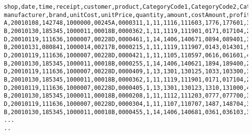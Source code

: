 \begin{verbatim}
shop,date,time,receipt,customer,product,CategoryCode1,CategoryCode2,CategoryCode4,CategoryCode6,
manufacturer,brand,unitCost,unitPrice,quantity,amount,costAmount,profit,YearMonth
A,20010108,142748,1000000,00245A,0000311,1,11,1116,111603,1776,177601,339,441,1,441,339,102,200101
B,20010130,185345,1000011,00018B,0000362,1,11,1119,111901,0171,017104,222,289,1,289,222,67,200101
D,20010119,111636,1000007,00228D,0000461,1,14,1406,140671,0894,089401,381,496,1,496,381,115,200101
B,20010131,080841,1000014,00217B,0000215,1,11,1119,111907,0143,014301,99,129,7,903,693,210,200101
D,20010119,111636,1000007,00228D,0000421,1,11,1105,110597,0616,061601,412,536,6,3216,2472,744,200101
B,20010130,185345,1000011,00018B,0000255,1,14,1406,140621,1894,189400,256,333,1,333,256,77,200101
D,20010119,111636,1000007,00228D,0000409,1,13,1301,130125,1033,103300,333,433,6,2598,1998,600,200101
B,20010130,185345,1000011,00018B,0000362,1,11,1119,111901,0171,017104,222,289,1,289,222,67,200101
D,20010119,111636,1000007,00228D,0000405,1,13,1301,130123,1310,131000,408,531,1,531,408,123,200101
B,20010130,185345,1000011,00018B,0000208,1,11,1112,111203,0777,077700,358,466,1,466,358,108,200101
D,20010119,111636,1000007,00228D,0000304,1,11,1107,110707,1487,148704,343,446,4,1784,1372,412,200101
B,20010130,185345,1000011,00018B,0000455,1,14,1406,140681,0361,036103,376,489,1,489,376,113,200101
...
..
 \end{verbatim}

%
